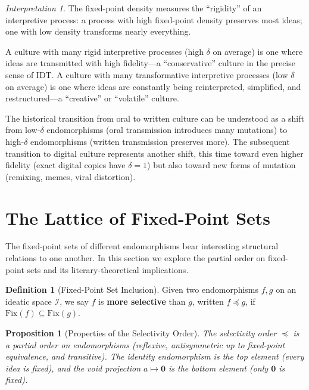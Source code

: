 \documentclass[11pt,openany]{book}
\theoremstyle{definition}
\newtheorem{definition}[axiom]{Definition}
\theoremstyle{plain}
\newtheorem{proposition}[axiom]{Proposition}
\theoremstyle{remark}
\newtheorem{interpretation}[axiom]{Interpretation}
\newcommand{\IS}{\mathcal{I}}               %
\newcommand{\void}{\mathbf{0}}              %
\begin{document}
\begin{interpretation}
The fixed-point density measures the ``rigidity'' of an interpretive process: a process with high fixed-point density preserves most ideas; one with low density transforms nearly everything.

A culture with many rigid interpretive processes (high $\delta$ on average) is one where ideas are transmitted with high fidelity---a ``conservative'' culture in the precise sense of IDT. A culture with many transformative interpretive processes (low $\delta$ on average) is one where ideas are constantly being reinterpreted, simplified, and restructured---a ``creative'' or ``volatile'' culture.

The historical transition from oral to written culture can be understood as a shift from low-$\delta$ endomorphisms (oral transmission introduces many mutations) to high-$\delta$ endomorphisms (written transmission preserves more). The subsequent transition to digital culture represents another shift, this time toward even higher fidelity (exact digital copies have $\delta = 1$) but also toward new forms of mutation (remixing, memes, viral distortion).
\end{interpretation}

\section{The Lattice of Fixed-Point Sets}

The fixed-point sets of different endomorphisms bear interesting structural relations to one another. In this section we explore the partial order on fixed-point sets and its literary-theoretical implications.

\begin{definition}[Fixed-Point Set Inclusion]
Given two endomorphisms $f, g$ on an ideatic space $\IS$, we say $f$ is \textbf{more selective} than $g$, written $f \preceq g$, if $\mathrm{Fix}(f) \subseteq \mathrm{Fix}(g)$.
\end{definition}

\begin{proposition}[Properties of the Selectivity Order]
The selectivity order $\preceq$ is a partial order on endomorphisms (reflexive, antisymmetric up to fixed-point equivalence, and transitive). The identity endomorphism is the top element (every idea is fixed), and the void projection $a \mapsto \void$ is the bottom element (only $\void$ is fixed).
\end{proposition}
\end{document}
